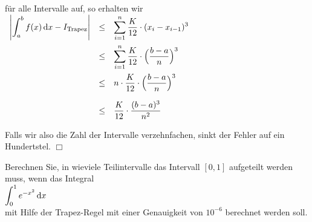 f\"ur alle Intervalle auf, so erhalten wir 
\\[0.2cm]
\hspace*{1.3cm}
$
\begin{array}[t]{lcl}  
\displaystyle \left| \int_a^b f(x)\,\textrm{d} x - I_{\mbox{\scriptsize Trapez}} \right|
& \leq & \displaystyle \sum\limits_{i=1}^n \frac{K}{12} \cdot  (x_i-x_{i-1})^3 \\[0.5cm]
& \leq & \displaystyle \sum\limits_{i=1}^n \frac{K}{12} \cdot  \Bigl(\frac{b-a}{n}\Bigr)^3 \\[0.5cm]
& \leq & \displaystyle n \cdot  \frac{K}{12} \cdot  \Bigl(\frac{b-a}{n}\Bigr)^3  \\[0.5cm]
& \leq & \displaystyle \frac{K}{12} \cdot  \frac{(b-a)^3}{n^2} \\[0.5cm]
\end{array}
$
\\[0.2cm]
Falls wir also die Zahl der Intervalle verzehnfachen, sinkt der Fehler auf ein Hundertstel.
\hspace*{\fill} $\Box$
\vspace*{0.3cm}

\exercise
Berechnen Sie, in wieviele Teilintervalle das Intervall $[0,1]$
aufgeteilt werden muss, wenn das Integral
\\[0.2cm]
\hspace*{1.3cm}
$\displaystyle \int_0^1 e^{-x^2}\, \textrm{d} x$
\\[0.2cm]
mit Hilfe der Trapez-Regel mit einer Genauigkeit von $10^{-6}$ berechnet werden soll. \eod


